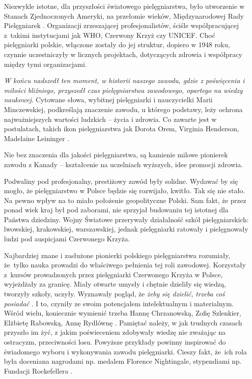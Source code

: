 \documentclass[a4paper,12pt,twoside,openright]{mwrep}
\begin{document}
Niezwykle istotne, dla przyszłości światowego pielęgniarstwa, było utworzenie w Stanach Zjednoczonych Ameryki, na przełomie wieków, Międzynarodowej Rady Pielęgniarek \cite{rada}. Organizacji zrzeszającej profesjonalistów, ściśle współpracującej z~takimi instytucjami jak WHO, Czerwony Krzyż czy UNICEF. Choć pielęgniarki polskie, włączone zostały do jej struktur, dopiero w 1948 roku, czynnie uczestniczyły w licznych projektach, dotyczących zdrowia i współpracy między tymi organizacjami.

\textit{W końcu nadszedł ten moment, w historii naszego zawodu, gdzie z poświęcenia i miłości bliźniego, przyszedł czas pielęgniarstwa zawodowego, opartego na wiedzy naukowej}. Cytowane słowa, wybitnej pielęgniarki i nauczycielki Marii Minczewskiej, podkreślają znaczenie zawodu, u którego podstawy, leży  ochrona najważniejszych wartości ludzkich – życia i zdrowia.  Co zawarte jest w postulatach, takich ikon pielęgniarstwa jak Dorota Orem, Virginia Henderson, Madelaine Leininger \cite{ikon}.

Nie bez znaczenia dla jakości pielęgniarstwa, są kamienie milowe pionierek zawodu z Kanady – kształcenie na uczelniach wyższych, idee promocji zdrowia.

Podwaliny pod profesjonalny, prestiżowy zawód były solidne. Wydawać by się mogło, że pielęgniarstwo w Polsce będzie się rozwijało, kwitło. Tak się nie stało. Na pewno wpływ na to miało położenie geopolityczne Polski. Sam fakt, że przez ponad wiek kraj był pod zaborami, nie sprzyjał budowaniu tej istotnej dla  Państwa dziedziny. Wojny Światowe przerywały działalność szkół pielęgniarskich: lwowskiej, krakowskiej, warszawskiej, jednak pielęgniarki ratowały i pielęgnowały ludzi pod auspicjami Czerwonego Krzyża.

Najbardziej znane i zasłużone pionierki polskiego pielęgniarstwa rozumiały, że~tylko nauka prowadzi do właściwego pełnienia tej roli zawodowej. Korzystały z~kursów prowadzonych przez pielęgniarki Czerwonego Krzyża  w Polsce, wyjeżdżały za granicę. Miały otwarte umysły i chętnie dzieliły się wiedzą, tworzyły szkoły, uczyły.  Wyznawały pogląd, że  \textit{żeby się dzielić, trzeba coś posiadać} \cite{ikonpol}. I to, czyniły ze swoim potencjałem intelektualnym i materialnym. Wśród wielu, koniecznie wymienić trzeba Hannę Chrzanowską, Zofię Szlenkier, Elżbietę Rabowską, Annę Rydlównę \cite{szkol}. Pamiętać należy, w jak trudnych czasach przyszło im żyć, z jakim poświeceniem zdobywały wiedzę nie zważając na ostracyzm, przeciwności losu. Powyższe przykłady powinny inspirować do świadomego wyboru i wykonywania zawodu pielęgniarki. Cieszy fakt, że~ich rola była doceniana nagrodami np. medalem Florence Nightingale, stypendiami np. Fundacji Rockefellera \cite{50}.
\end{document}
